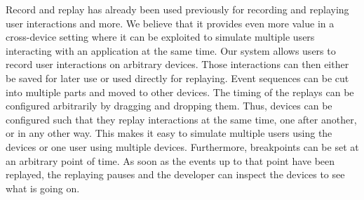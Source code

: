 Record and replay has already been used previously for recording and replaying user interactions and more. We believe that it provides even more value in a cross-device setting where it can be exploited to simulate multiple users interacting with an application at the same time. Our system allows users to record user interactions on arbitrary devices. Those interactions can then either be saved for later use or used directly for replaying. Event sequences can be cut into multiple parts and moved to other devices. The timing of the replays can be configured arbitrarily by dragging and dropping them. Thus, devices can be configured such that they replay interactions at the same time, one after another, or in any other way. This makes it easy to simulate multiple users using the devices or one user using multiple devices. Furthermore, breakpoints can be set at an arbitrary point of time. As soon as the events up to that point have been replayed, the replaying pauses and the developer can inspect the devices to see what is going on. 
